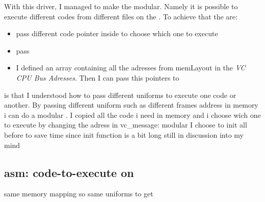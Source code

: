 With this driver, I managed to make the \api{} modular. Namely it is possible to execute different codes from different  files on the \vc.
To achieve that the  are:

\begin{itemize}
	\item pass different code pointer inside  to choose which one to execute
	\item pass
	\item I defined an array containing all the adresses from memLayout in the \emph{VC CPU Bus Adresses}. Then I can pass this pointers to \qpu
\end{itemize}
		is that I understood how to pass different uniforms to execute one code or another. By passing different uniform such as different frames address in memory i can do a modular \api.
I copied all the code i need in memory and i choose wich one to execute by changing the adress in vc\_message: modular \api
I choose to init all before to save time since init function is a bit long still in discussion into my mind
\subsection{asm: code-to-execute on \vc}
same memory mapping so same uniforms to get
